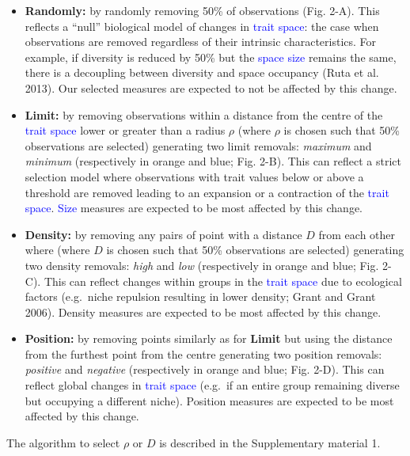 \documentclass[]{article}
\begin{document}
\begin{itemize}
\item
  \textbf{Randomly:} by randomly removing 50\% of observations (Fig.
  2-A). This reflects a ``null'' biological model of changes in
  \textcolor{blue}{trait space}: the case when observations
  are removed regardless of their intrinsic characteristics. For
  example, if diversity is reduced by 50\% but the
  \textcolor{blue}{space size} remains the same, there is a
  decoupling between diversity and space occupancy (Ruta et al. 2013).
  Our selected measures are expected to not be affected by this change.
\item
  \textbf{Limit:} by removing observations within a distance from the
  centre of the \textcolor{blue}{trait space} lower or
  greater than a radius \(\rho\) (where \(\rho\) is chosen such that
  50\% observations are selected) generating two limit removals:
  \emph{maximum} and \emph{minimum} (respectively in orange and blue;
  Fig. 2-B). This can reflect a strict selection model where
  observations with trait values below or above a threshold are removed
  leading to an expansion or a contraction of the
  \textcolor{blue}{trait space}.
  \textcolor{blue}{Size} measures are expected to be most
  affected by this change.
\item
  \textbf{Density:} by removing any pairs of point with a distance \(D\)
  from each other where (where \(D\) is chosen such that 50\%
  observations are selected) generating two density removals:
  \emph{high} and \emph{low} (respectively in orange and blue; Fig.
  2-C). This can reflect changes within groups in the
  \textcolor{blue}{trait space} due to ecological factors
  (e.g.~niche repulsion resulting in lower density; Grant and Grant
  2006). Density measures are expected to be most affected by this
  change.
\item
  \textbf{Position:} by removing points similarly as for \textbf{Limit}
  but using the distance from the furthest point from the centre
  generating two position removals: \emph{positive} and \emph{negative}
  (respectively in orange and blue; Fig. 2-D). This can reflect global
  changes in \textcolor{blue}{trait space} (e.g.~if an
  entire group remaining diverse but occupying a different niche).
  Position measures are expected to be most affected by this change.
\end{itemize}

The algorithm to select \(\rho\) or \(D\) is described in the
Supplementary material 1.

\renewcommand\baselinestretch{1}\selectfont
\end{document}
